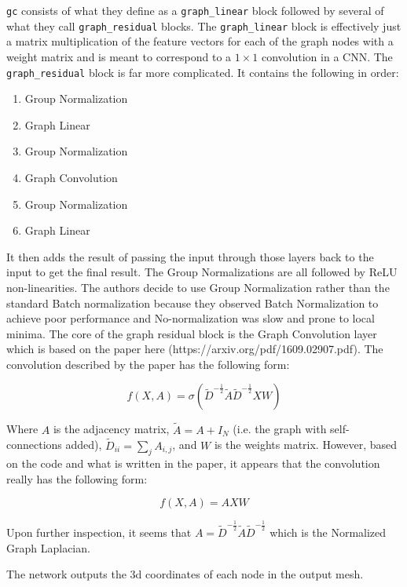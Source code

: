 \documentclass{report}
\begin{document}
	\texttt{gc} consists of what they define as a \texttt{graph\_linear} block followed by several of what they call \texttt{graph\_residual} blocks. The \texttt{graph\_linear} block is effectively just a matrix multiplication of the feature vectors for each of the graph nodes with a weight matrix and is meant to correspond to a $1 \times 1$ convolution in a CNN. The \texttt{graph\_residual} block is far more complicated. It contains the following in order:
	
	\begin{enumerate}
		\item Group Normalization 
		\item Graph Linear
		\item Group Normalization
		\item Graph Convolution
		\item Group Normalization
		\item Graph Linear
	\end{enumerate} 
	
	It then adds the result of passing the input through those layers back to the input to get the final result. The Group Normalizations are all followed by ReLU non-linearities. The authors decide to use Group Normalization rather than the standard Batch normalization because they observed Batch Normalization to achieve poor performance and No-normalization was slow and prone to local minima. The core of the graph residual block is the Graph Convolution layer which is based on the paper here (https://arxiv.org/pdf/1609.02907.pdf). The convolution described by the paper has the following form:
	
	\begin{equation}
	f(X, A) = \sigma\left(\tilde{D}^{-\frac{1}{2}} \tilde{A} \tilde{D}^{-\frac{1}{2}}XW\right)
	\end{equation}
	
	Where $A$ is the adjacency matrix, $\tilde{A} = A + I_N$ (i.e. the graph with self-connections added), $\tilde{D}_{ii} = \sum_{j} A_{i,j}$, and $W$ is the weights matrix. However, based on the code and what is written in the paper, it appears that the convolution really has the following form:
	
	\begin{equation}
	f(X, A) = AXW
	\end{equation}
	
	Upon further inspection, it seems that $A = \tilde{D}^{-\frac{1}{2}} \tilde{A} \tilde{D}^{-\frac{1}{2}}$ which is the Normalized Graph Laplacian.
	
The network outputs the 3d coordinates of each node in the output mesh.
\end{document}
